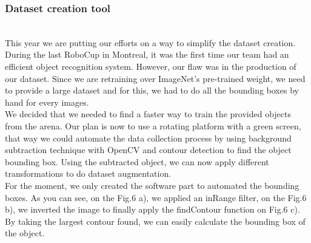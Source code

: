 \documentclass[runningheads,a4paper]{llncs}
\begin{document}
\subsubsection{Dataset creation tool}
\hfill\\

This year we are putting our efforts on a way to simplify the dataset creation. During the last RoboCup in Montreal, it was the first time our team had an efficient object recognition system. However, our flaw was in the production of our dataset. Since we are retraining over ImageNet's pre-trained weight, we need to provide a large dataset and for this, we had to do all the bounding boxes by hand for every images.\\
 
We decided that we needed to find a faster way to train the provided objects from the arena. Our plan is now to use a rotating platform with a green screen, that way we could automate the data collection process by using background subtraction technique with OpenCV and contour detection to find the object bounding box. Using the subtracted object, we can now apply different transformations to do dataset augmentation. \\

For the moment, we only created the software part to automated the bounding boxes. As you can see, on the Fig.6 a), we applied an inRange filter, on the Fig.6 b), we inverted the image to finally apply the findContour function on Fig.6 c). By taking the largest contour found, we can easily calculate the bounding box of the object.  \\
 
\end{document}
